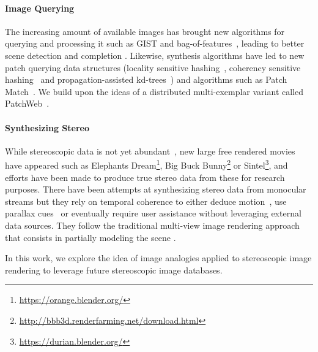 \paragraph{Image Querying}
The increasing amount of available images has brought new algorithms for querying and processing it such as GIST and bag-of-features~\cite{Oliva01, Torralba08, Douze09}, leading to better scene detection and completion \cite{Hays07}.
Likewise, synthesis algorithms have led to new patch querying data structures (locality sensitive hashing~\cite{Gionis99}, coherency sensitive hashing~\cite{Korman11} and propagation-assisted kd-trees~\cite{He12}) and algorithms such as Patch Match~\cite{Barnes09}.
We build upon the ideas of a distributed multi-exemplar variant called PatchWeb~\cite{Barnes11}.

\paragraph{Synthesizing Stereo}
While stereoscopic data is not yet abundant~\cite{Corrigan10, Smolic10}, 
new large free rendered movies have appeared such as Elephants Dream\footnote{\url{https://orange.blender.org/}}, 
Big Buck Bunny\footnote{\url{http://bbb3d.renderfarming.net/download.html}} or 
Sintel\footnote{\url{https://durian.blender.org/}}, and efforts have been made to produce true stereo data from these for research purposes.
There have been attempts at synthesizing stereo data from monocular streams but they rely on temporal coherence to either deduce motion~\cite{Moustakas05}, use parallax cues~\cite{Zhang07} or eventually require user assistance \cite{Wang11} without leveraging external data sources.
They follow the traditional multi-view image rendering approach that consists in partially modeling the scene \cite{Seitz06, Kopf14}.

In this work, we explore the idea of image analogies applied to stereoscopic image rendering to leverage future stereoscopic image databases.